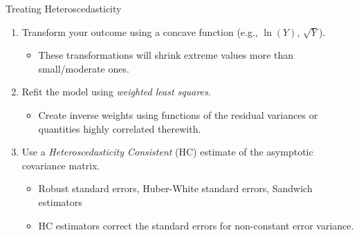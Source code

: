\documentclass{beamer}\usepackage[]{graphicx}\usepackage[]{color}
\begin{document}

\begin{frame}{Treating Heteroscedasticity}
  
  \begin{enumerate}
  \item Transform your outcome using a concave function (e.g., $\ln(Y)$,
    $\sqrt{Y}$).  
    \vc
    \begin{itemize}
    \item These transformations will shrink extreme values more than
      small/moderate ones.
    \end{itemize}
    \vb
  \item Refit the model using \emph{weighted least squares}.
    \vc
    \begin{itemize}
    \item Create inverse weights using functions of the residual variances or
      quantities highly correlated therewith.
    \end{itemize}
    \vb
  \item Use a \emph{Heteroscedasticity Consistent} (HC) estimate of the 
    asymptotic covariance matrix. 
    \vc
    \begin{itemize}
    \item Robust standard errors, Huber-White standard errors, Sandwich 
      estimators
    \item HC estimators correct the standard errors for non-constant error 
      variance.
    \end{itemize}
  \end{enumerate}
  
\end{frame}

\watermarkoff %
\end{document}
